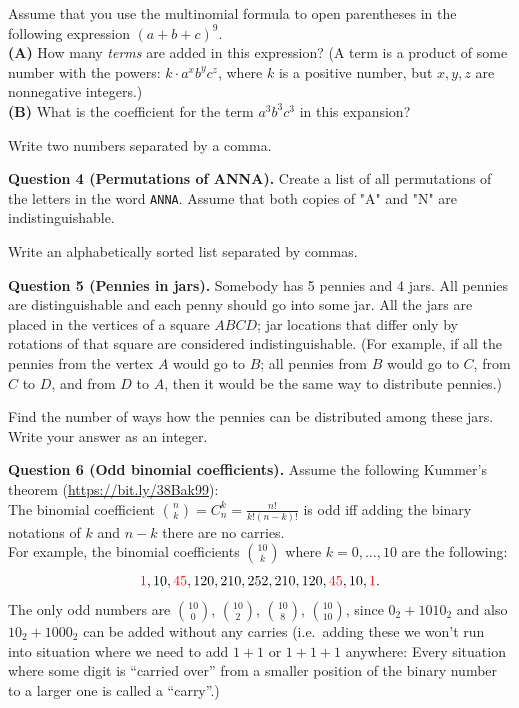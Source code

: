 \documentclass[jou]{apa6}
\begin{document}
Assume that you use the multinomial formula to open parentheses in the following expression $(a+b+c)^9$.\\
{\bf (A)} How many {\em terms} are added in this expression?  (A term is a product 
of some number with the powers: $k\cdot a^x b^y c^z$, where $k$ is a positive number, but 
$x,y,z$ are nonnegative integers.)\\
{\bf (B)} What is the coefficient for the term $a^3b^3c^3$ in this expansion?

Write two numbers separated by a comma.




\vspace{6pt}
{\bf Question 4 (Permutations of ANNA).} Create a list of all permutations
of the letters in the word {\tt ANNA}. Assume that both copies of "A" and "N" are indistinguishable. 

Write an alphabetically sorted list separated by commas.


\vspace{6pt}
{\bf Question 5 (Pennies in jars).} 
Somebody has 5 pennies and 4 jars. All pennies are distinguishable and each penny should go into some jar. 
All the jars are placed in the vertices of a square $ABCD$; jar locations that differ only by rotations of that
square are considered indistinguishable. (For example, if all the pennies from the vertex $A$ would go to $B$; 
all pennies from $B$ would go to $C$, from $C$ to $D$, and from $D$ to $A$, then it would be the same way to distribute pennies.)

Find the number of ways how the pennies can be distributed among these jars. Write your answer as an integer.



\vspace{6pt}
{\bf Question 6 (Odd binomial coefficients).} Assume the following Kummer's theorem (\url{https://bit.ly/38Bak99}):\\
The binomial coefficient ${n \choose k} = C_n^k = \frac{n!}{k!(n-k)!}$ is odd iff
adding the binary notations of $k$ and $n-k$ there are no carries.\\ 
For example, the binomial coefficients ${10 \choose k}$ where $k=0,\ldots,10$ are the following:
$$\textcolor{red}{1},10,\textcolor{red}{45},120,210,252,210,120,\textcolor{red}{45},10,\textcolor{red}{1}.$$
The only odd numbers are ${10 \choose 0}$, ${10 \choose 2}$, ${10 \choose 8}$, ${10 \choose 10}$, 
since $0_{2} + 1010_{2}$ and also $10_{2} + 1000_{2}$ can be added without any carries (i.e.\
adding these we won't run into situation where we need to add $1+1$ or $1+1+1$ anywhere: Every situation 
where some digit is ``carried over'' from a smaller position of the binary number to a larger one is called a ``carry''.)
\end{document}
